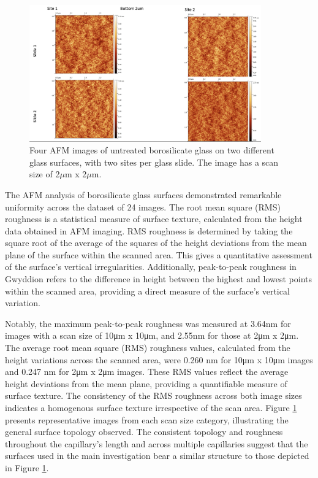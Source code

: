 \begin{figure}[h!!!!]     %
        \begin{center}
          \includegraphics[width=100mm]{chapter3/bot 2um.png}
\end{center}
\caption{Four AFM images of untreated borosilicate glass on two different glass surfaces, with two sites per glass slide. The image has a scan size of 2$\mu$m x 2$\mu$m.}
\label{fig:figure9}                 %
\end{figure}   

The AFM analysis of borosilicate glass surfaces demonstrated remarkable uniformity across the dataset of 24 images. The root mean square (RMS) roughness is a statistical measure of surface texture, calculated from the height data obtained in AFM imaging. RMS roughness is determined by taking the square root of the average of the squares of the height deviations from the mean plane of the surface within the scanned area. This gives a quantitative assessment of the surface's vertical irregularities. Additionally, peak-to-peak roughness in Gwyddion refers to the difference in height between the highest and lowest points within the scanned area, providing a direct measure of the surface's vertical variation.\cite{gwy}

Notably, the maximum peak-to-peak roughness was measured at 3.64nm for images with a scan size of 10μm x 10μm, and 2.55nm for those at 2μm x 2μm. The average root mean square (RMS) roughness values, calculated from the height variations across the scanned area, were 0.260 nm for 10μm x 10μm images and 0.247 nm for 2μm x 2μm images. These RMS values reflect the average height deviations from the mean plane, providing a quantifiable measure of surface texture. The consistency of the RMS roughness across both image sizes indicates a homogenous surface texture irrespective of the scan area. Figure \ref{fig:figure9} presents representative images from each scan size category, illustrating the general surface topology observed. The consistent topology and roughness throughout the capillary's length and across multiple capillaries suggest that the surfaces used in the main investigation bear a similar structure to those depicted in Figure \ref{fig:figure9}.\cite{AFMbactPaper}
  

